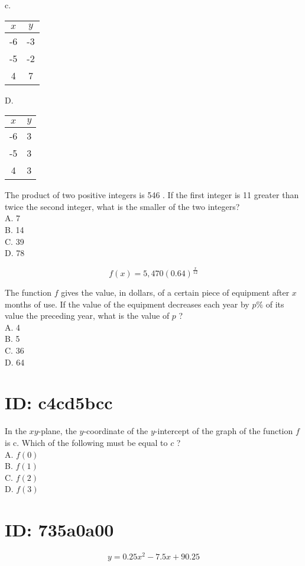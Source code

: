 c.

\begin{center}
\begin{tabular}{|c|c|}
\hline
$x$ & $y$ \\
\hline
-6 & -3 \\
\hline
-5 & -2 \\
\hline
4 & 7 \\
\hline
\end{tabular}
\end{center}

D.

\begin{center}
\begin{tabular}{|c|c|}
\hline
$x$ & $y$ \\
\hline
-6 & 3 \\
\hline
-5 & 3 \\
\hline
4 & 3 \\
\hline
\end{tabular}
\end{center}

The product of two positive integers is 546 . If the first integer is 11 greater than twice the second integer, what is the smaller of the two integers?\\
A. 7\\
B. 14\\
C. 39\\
D. 78

$$
f(x)=5,470(0.64)^{\frac{x}{12}}
$$

The function $f$ gives the value, in dollars, of a certain piece of equipment after $x$ months of use. If the value of the equipment decreases each year by $p \%$ of its value the preceding year, what is the value of $p$ ?\\
A. 4\\
B. 5\\
C. 36\\
D. 64

\section*{ID: c4cd5bcc}
In the $x y$-plane, the $y$-coordinate of the $y$-intercept of the graph of the function $f$ is c. Which of the following must be equal to $c$ ?\\
A. $f(0)$\\
B. $f(1)$\\
C. $f(2)$\\
D. $f(3)$

\section*{ID: 735a0a00}
$$
y=0.25 x^{2}-7.5 x+90.25
$$

